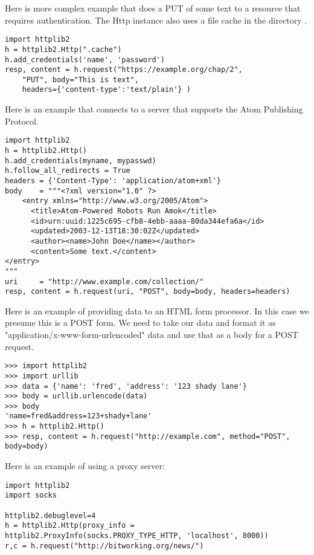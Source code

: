 Here is more complex example that does a PUT 
of some text to a resource that requires authentication.
The Http instance also uses a file cache
in the directory . 

\begin{verbatim}
import httplib2
h = httplib2.Http(".cache")
h.add_credentials('name', 'password')
resp, content = h.request("https://example.org/chap/2", 
    "PUT", body="This is text", 
    headers={'content-type':'text/plain'} )
\end{verbatim}

Here is an example that connects to a server that 
supports the Atom Publishing Protocol.

\begin{verbatim}
import httplib2
h = httplib2.Http()
h.add_credentials(myname, mypasswd)
h.follow_all_redirects = True
headers = {'Content-Type': 'application/atom+xml'}
body    = """<?xml version="1.0" ?>
    <entry xmlns="http://www.w3.org/2005/Atom">
      <title>Atom-Powered Robots Run Amok</title>
      <id>urn:uuid:1225c695-cfb8-4ebb-aaaa-80da344efa6a</id>
      <updated>2003-12-13T18:30:02Z</updated>
      <author><name>John Doe</name></author>
      <content>Some text.</content>
</entry>
"""
uri     = "http://www.example.com/collection/"
resp, content = h.request(uri, "POST", body=body, headers=headers)
\end{verbatim}

Here is an example of providing data to an HTML form processor.
In this case we presume this is a POST form. We need to take our 
data and format it as "application/x-www-form-urlencoded" data and use that as a 
body for a POST request.

\begin{verbatim}
>>> import httplib2
>>> import urllib
>>> data = {'name': 'fred', 'address': '123 shady lane'}
>>> body = urllib.urlencode(data)
>>> body
'name=fred&address=123+shady+lane'
>>> h = httplib2.Http()
>>> resp, content = h.request("http://example.com", method="POST", body=body)
\end{verbatim}

Here is an example of using a proxy server:
\begin{verbatim}
import httplib2
import socks

httplib2.debuglevel=4
h = httplib2.Http(proxy_info = httplib2.ProxyInfo(socks.PROXY_TYPE_HTTP, 'localhost', 8000))
r,c = h.request("http://bitworking.org/news/")
\end{verbatim}



